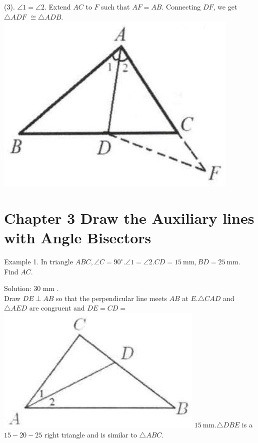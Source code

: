 \documentclass[10pt]{article}
\begin{document}
(3). \(\angle 1=\angle 2\). Extend \(A C\) to \(F\) such that \(A F=A B\). Connecting \(D F\), we get \(\triangle A D F\) \(\cong \triangle A D B\).\\
\includegraphics[max width=\textwidth, center]{2025_04_17_97bc1f7e44d93c271a88g-054(2)}

\section*{Chapter 3 Draw the Auxiliary lines with Angle Bisectors}
Example 1. In triangle \(A B C, \angle C=90^{\circ} . \angle 1=\angle 2 . C D=15 \mathrm{~mm}, B D=25 \mathrm{~mm}\). Find \(A C\).

Solution: 30 mm .\\
Draw \(D E \perp A B\) so that the perpendicular line meets \(A B\) at \(E . \triangle C A D\) and \(\triangle A E D\) are congruent and \(D E=C D=\)\\
\includegraphics[max width=\textwidth]{2025_04_17_97bc1f7e44d93c271a88g-055} \(15 \mathrm{~mm} . \triangle D B E\) is a \(15-20-25\) right triangle and is similar to \(\triangle A B C\).
\end{document}
